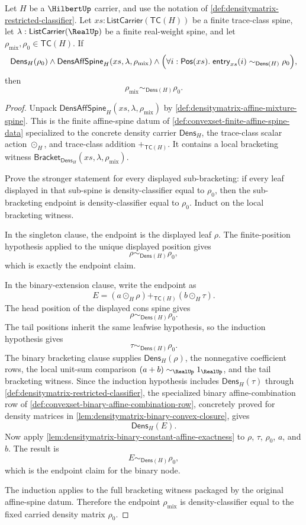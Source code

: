 \begin{theorem}
\label{thm:densitymatrix-constant-affine-spine-exactness}
Let $H$ be a $\HilbertUp$ carrier, and use the notation of \autoref{def:densitymatrix-restricted-classifier}. Let $xs:\mathsf{ListCarrier}(\mathsf{TC}(H))$ be a finite trace-class spine, let $\lambda:\mathsf{ListCarrier}(\RealUp)$ be a finite real-weight spine, and let $\rho_{\mathrm{mix}},\rho_0\in\mathsf{TC}(H)$. If
$$
\mathsf{Dens}_H(\rho_0)
\land
\mathsf{DensAffSpine}_H(xs,\lambda,\rho_{\mathrm{mix}})
\land
\Bigl(\forall i:\mathsf{Pos}(xs).\;
\mathsf{entry}_{xs}(i)\sim_{\mathsf{Dens}(H)}\rho_0\Bigr),
$$
then
$$
\rho_{\mathrm{mix}}\sim_{\mathsf{Dens}(H)}\rho_0.
$$
\end{theorem}
\begin{proof}
Unpack $\mathsf{DensAffSpine}_H(xs,\lambda,\rho_{\mathrm{mix}})$ by \autoref{def:densitymatrix-affine-mixture-spine}. This is the finite affine-spine datum of \autoref{def:convexset-finite-affine-spine-data} specialized to the concrete density carrier $\mathsf{Dens}_H$, the trace-class scalar action $\odot_H$, and trace-class addition $+_{\mathsf{TC}(H)}$. It contains a local bracketing witness $\mathsf{Bracket}_{\mathsf{Dens}_H}(xs,\lambda,\rho_{\mathrm{mix}})$.

Prove the stronger statement for every displayed sub-bracketing: if every leaf displayed in that sub-spine is density-classifier equal to $\rho_0$, then the sub-bracketing endpoint is density-classifier equal to $\rho_0$. Induct on the local bracketing witness.

In the singleton clause, the endpoint is the displayed leaf $\rho$. The finite-position hypothesis applied to the unique displayed position gives
$$
\rho\sim_{\mathsf{Dens}(H)}\rho_0,
$$
which is exactly the endpoint claim.

In the binary-extension clause, write the endpoint as
$$
E=(a\odot_H\rho)+_{\mathsf{TC}(H)}(b\odot_H\tau).
$$
The head position of the displayed cons spine gives
$$
\rho\sim_{\mathsf{Dens}(H)}\rho_0.
$$
The tail positions inherit the same leafwise hypothesis, so the induction hypothesis gives
$$
\tau\sim_{\mathsf{Dens}(H)}\rho_0.
$$
The binary bracketing clause supplies $\mathsf{Dens}_H(\rho)$, the nonnegative coefficient rows, the local unit-sum comparison $(a+b)\sim_{\RealUp}1_{\RealUp}$, and the tail bracketing witness. Since the induction hypothesis includes $\mathsf{Dens}_H(\tau)$ through \autoref{def:densitymatrix-restricted-classifier}, the specialized binary affine-combination row of \autoref{def:convexset-binary-affine-combination-row}, concretely proved for density matrices in \autoref{lem:densitymatrix-binary-convex-closure}, gives
$$
\mathsf{Dens}_H(E).
$$
Now apply \autoref{lem:densitymatrix-binary-constant-affine-exactness} to $\rho$, $\tau$, $\rho_0$, $a$, and $b$. The result is
$$
E\sim_{\mathsf{Dens}(H)}\rho_0,
$$
which is the endpoint claim for the binary node.

The induction applies to the full bracketing witness packaged by the original affine-spine datum. Therefore the endpoint $\rho_{\mathrm{mix}}$ is density-classifier equal to the fixed carried density matrix $\rho_0$.
\end{proof}
